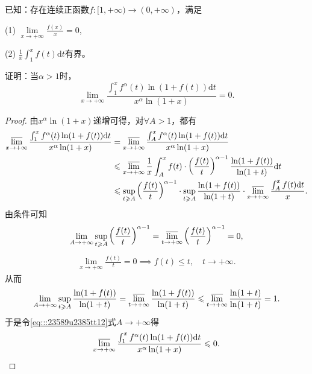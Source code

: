 \documentclass[../../main.tex]{subfiles}
\begin{document}
\begin{example}
已知：存在连续正函数\( f : [1, +\infty) \to (0, +\infty) \)，满足

(1) \( \lim\limits_{x \to +\infty} \frac{f(x)}{x} = 0 \),

(2) \( \frac{1}{x} \int_1^x f(t)\mathrm{d}t \)有界。

证明：当\( \alpha > 1 \)时，
\[
\lim_{x \to +\infty} \frac{\int_1^x f^\alpha(t) \ln(1 + f(t))\mathrm{d}t}{x^\alpha \ln(1 + x)} = 0.
\]
\end{example}
\begin{proof}
由\( x^{\alpha}\ln(1 + x) \)递增可得，对\( \forall A > 1 \)，都有
\begin{align}
\varlimsup_{x \to +\infty} \frac{\int_1^x f^{\alpha}(t)\ln(1 + f(t))\mathrm{d}t}{x^{\alpha}\ln(1 + x)} &= \varlimsup_{x \to +\infty} \frac{\int_A^x f^{\alpha}(t)\ln(1 + f(t))\mathrm{d}t}{x^{\alpha}\ln(1 + x)}  \nonumber \\
&\leqslant \varlimsup_{x \to +\infty} \frac{1}{x} \int_A^x f(t) \cdot \left( \frac{f(t)}{t} \right)^{\alpha - 1} \frac{\ln(1 + f(t))}{\ln(1 + t)}\mathrm{d}t \nonumber \\
&\leqslant \sup_{t \geqslant A} \left( \frac{f(t)}{t} \right)^{\alpha - 1} \cdot \sup_{t \geqslant A} \frac{\ln(1 + f(t))}{\ln(1 + t)} \cdot \varlimsup_{x \to +\infty} \frac{\int_A^x f(t)\mathrm{d}t}{x}. \label{eq:::23589u2385tt12}
\end{align}
由条件可知
\begin{align*}
\lim_{A \to +\infty} \sup_{t \geqslant A} \left( \frac{f(t)}{t} \right)^{\alpha - 1} = \varlimsup_{t \to +\infty} \left( \frac{f(t)}{t} \right)^{\alpha - 1} = 0,
\end{align*}
\begin{align*}
\lim_{x \to +\infty} \frac{f(t)}{t} = 0 \implies f(t) \leqslant t, \quad t \to +\infty.
\end{align*}
从而
\begin{align*}
\lim_{A \to +\infty} \sup_{t \geqslant A} \frac{\ln(1 + f(t))}{\ln(1 + t)} = \varlimsup_{t \to +\infty} \frac{\ln(1 + f(t))}{\ln(1 + t)} \leqslant \varlimsup_{t \to +\infty} \frac{\ln(1 + t)}{\ln(1 + t)} = 1.
\end{align*}
于是令\eqref{eq:::23589u2385tt12}式\( A \to +\infty \)得
\begin{align*}
\varlimsup_{x \to +\infty} \frac{\int_1^x f^{\alpha}(t)\ln(1 + f(t))\mathrm{d}t}{x^{\alpha}\ln(1 + x)} \leqslant 0.
\end{align*}

\end{proof}
\end{document}
